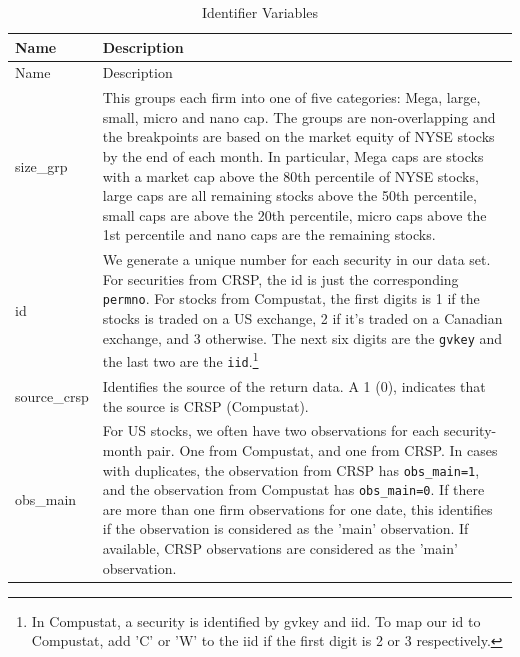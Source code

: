 \documentclass[12pt,title,fleqn]{article}
\begin{document}
{\scriptsize
	\begin{longtable}{@{\extracolsep{\fill}}|l|m{14.2cm}|@{}}
	\caption{Identifier Variables \label{identification_var}}\\
	
	
	
	\hline
	Name & Description \\
	\hline
	\endfirsthead
	
	\hline
	Name & Description \\
	\hline
	\endhead
	
	\hline
	\endfoot
	
	
	\hline\hline
	\endlastfoot
	
		size\_grp & This groups each firm into one of five categories: Mega, large, small, micro and nano cap. The groups are non-overlapping and the breakpoints are based on the market equity of NYSE stocks by the end of each month. In particular, Mega caps are stocks with a market cap above the 80th percentile of NYSE stocks, large caps are all remaining stocks above the 50th percentile, small caps are above the 20th percentile, micro caps above the 1st percentile and nano caps are the remaining stocks. \\[1ex]
		
		id & We generate a unique number for each security in our data set. For securities from CRSP, the id is just the corresponding \texttt{permno}. For stocks from Compustat, the first digits is 1 if the stocks is traded on a US exchange, 2 if it's traded on a Canadian exchange, and 3 otherwise. The next six digits are the  \texttt{gvkey} and the last two are the \texttt{iid}.\footnote{In Compustat, a security is identified by gvkey and iid. To map our id to Compustat, add 'C' or 'W' to the iid if the first digit is 2 or 3 respectively.}  \\[1ex]
		
		source\_crsp & Identifies the source of the return data. A 1 (0), indicates that the source is CRSP (Compustat). \\[1ex]
		
		obs\_main & For US stocks, we often have two observations for each security-month pair. One from Compustat, and one from CRSP. In cases with duplicates, the observation from CRSP has \texttt{obs\_main=1}, and the observation from Compustat has \texttt{obs\_main=0}.  
		If there are more than one firm observations for one date, this identifies if the observation is considered as the 'main' observation. If available, CRSP observations are considered as the 'main' observation.\\[1ex]
		

\end{longtable}}
\end{document}

